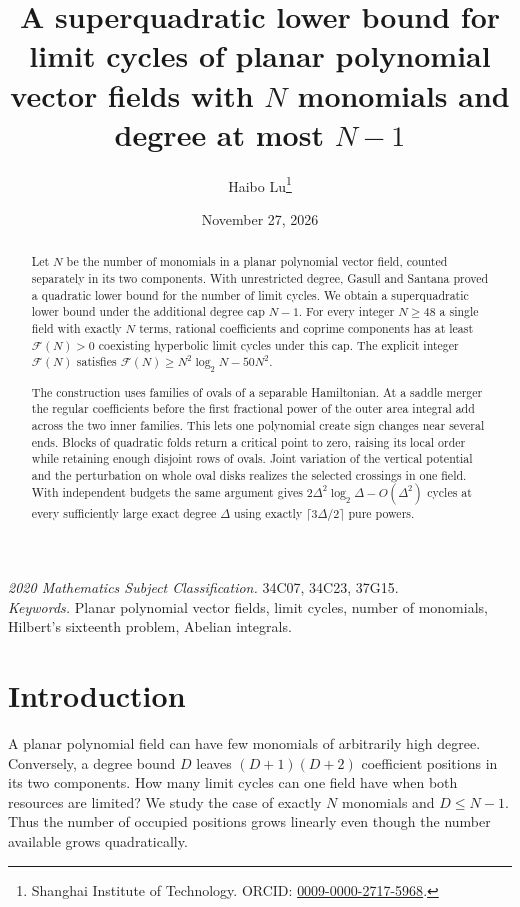 
\usepackage{tikz,placeins}
\title{A superquadratic lower bound for limit cycles of planar polynomial vector fields with \texorpdfstring{\(N\)}{N} monomials and degree at most \texorpdfstring{\(N-1\)}{N-1}}
\author{Haibo Lu\thanks{Shanghai Institute of Technology. ORCID: \href{https://orcid.org/0009-0000-2717-5968}{0009-0000-2717-5968}.}}
\date{November 27, 2026}

\maketitle
\begin{abstract}
Let \(N\) be the number of monomials in a planar polynomial vector field, counted separately in its two components. With unrestricted degree, Gasull and Santana proved a quadratic lower bound for the number of limit cycles. We obtain a superquadratic lower bound under the additional degree cap \(N-1\). For every integer \(N\ge48\) a single field with exactly \(N\) terms, rational coefficients and coprime components has at least \(\mathcal F(N)>0\) coexisting hyperbolic limit cycles under this cap. The explicit integer \(\mathcal F(N)\) satisfies \(\mathcal F(N)\ge N^2\log_2 N-50N^2\).

The construction uses families of ovals of a separable Hamiltonian. At a saddle merger the regular coefficients before the first fractional power of the outer area integral add across the two inner families. This lets one polynomial create sign changes near several ends. Blocks of quadratic folds return a critical point to zero, raising its local order while retaining enough disjoint rows of ovals. Joint variation of the vertical potential and the perturbation on whole oval disks realizes the selected crossings in one field. With independent budgets the same argument gives \(2\Delta^2\log_2\Delta-O(\Delta^2)\) cycles at every sufficiently large exact degree \(\Delta\) using exactly \(\lceil3\Delta/2\rceil\) pure powers.
\end{abstract}
\noindent\textit{2020 Mathematics Subject Classification.} 34C07, 34C23, 37G15.\\
\textit{Keywords.} Planar polynomial vector fields, limit cycles, number of monomials, Hilbert's sixteenth problem, Abelian integrals.

\section{Introduction}\label{sec:intro}
A planar polynomial field can have few monomials of arbitrarily high degree. Conversely, a degree bound \(D\) leaves \((D+1)(D+2)\) coefficient positions in its two components. How many limit cycles can one field have when both resources are limited? We study the case of exactly \(N\) monomials and \(D\le N-1\). Thus the number of occupied positions grows linearly even though the number available grows quadratically.

